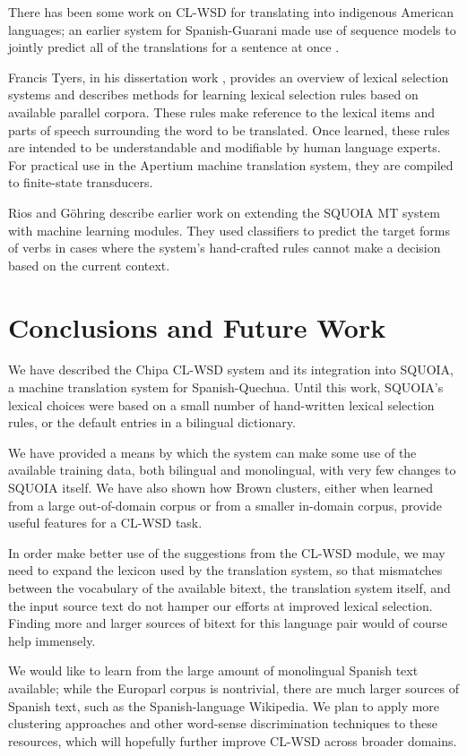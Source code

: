\documentclass[10pt, a4paper]{article}
\begin{document}
There has been some work on CL-WSD for translating into indigenous American
languages; an earlier system for Spanish-Guarani made use of sequence models to
jointly predict all of the translations for a sentence at once
\cite{rudnick-gasser:2013:HyTra}.

Francis Tyers, in his dissertation work ,
provides an overview of lexical selection systems and describes methods for
learning lexical selection rules based on available parallel corpora. These
rules make reference to the lexical items and parts of speech surrounding the
word to be translated. Once learned, these rules are intended to be
understandable and modifiable by human language experts. For practical use in
the Apertium machine translation system, they are compiled to finite-state
transducers.

Rios and G\"{o}hring  describe
earlier work on extending the SQUOIA MT system with machine learning modules.
They used classifiers to predict the target forms of verbs in cases where the
system's hand-crafted rules cannot make a decision based on the current
context.

\section{Conclusions and Future Work}
We have described the Chipa CL-WSD system and its integration into SQUOIA,
a machine translation system for Spanish-Quechua.
Until this work, SQUOIA's lexical choices were based on a small number of
hand-written lexical selection rules, or the default entries in a bilingual
dictionary. 

We have provided a means by which the system can make some use of
the available training data, both bilingual and monolingual, with very few
changes to SQUOIA itself. We have also shown how Brown clusters, either when
learned from a large out-of-domain corpus or from a smaller in-domain corpus,
provide useful features for a CL-WSD task.

In order make better use of the suggestions from the CL-WSD module, we may
need to expand the lexicon used by the translation system, so that mismatches
between the vocabulary of the available bitext, the translation system itself,
and the input source text do not hamper our efforts at improved lexical
selection. Finding more and larger sources of bitext for this language pair
would of course help immensely.

We would like to learn from the large amount of monolingual Spanish text
available; while the Europarl corpus is nontrivial, there are much larger
sources of Spanish text, such as the Spanish-language Wikipedia.  We plan
to apply more clustering approaches and other word-sense discrimination
techniques to these resources, which will hopefully further improve CL-WSD
across broader domains.
\end{document}
